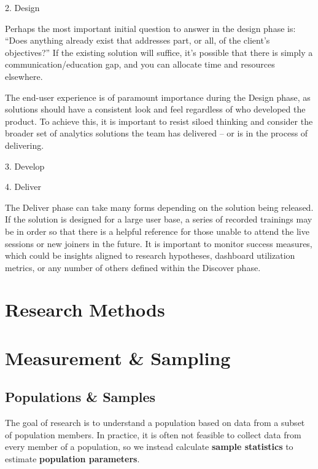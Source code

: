 \documentclass[]{book}
\begin{document}
2. Design

Perhaps the most important initial question to answer in the design phase is: ``Does anything already exist that addresses part, or all, of the client's objectives?'' If the existing solution will suffice, it's possible that there is simply a communication/education gap, and you can allocate time and resources elsewhere.

The end-user experience is of paramount importance during the Design phase, as solutions should have a consistent look and feel regardless of who developed the product. To achieve this, it is important to resist siloed thinking and consider the broader set of analytics solutions the team has delivered -- or is in the process of delivering.

3. Develop

4. Deliver

The Deliver phase can take many forms depending on the solution being released. If the solution is designed for a large user base, a series of recorded trainings may be in order so that there is a helpful reference for those unable to attend the live sessions or new joiners in the future. It is important to monitor success measures, which could be insights aligned to research hypotheses, dashboard utilization metrics, or any number of others defined within the Discover phase.

\hypertarget{research-methods}{%
\chapter{Research Methods}\label{research-methods}}

\hypertarget{measurement-sampling}{%
\chapter{Measurement \& Sampling}\label{measurement-sampling}}

\hypertarget{populations-samples}{%
\section{Populations \& Samples}\label{populations-samples}}

The goal of research is to understand a population based on data from a subset of population members. In practice, it is often not feasible to collect data from every member of a population, so we instead calculate \textbf{sample statistics} to estimate \textbf{population parameters}.
\end{document}
